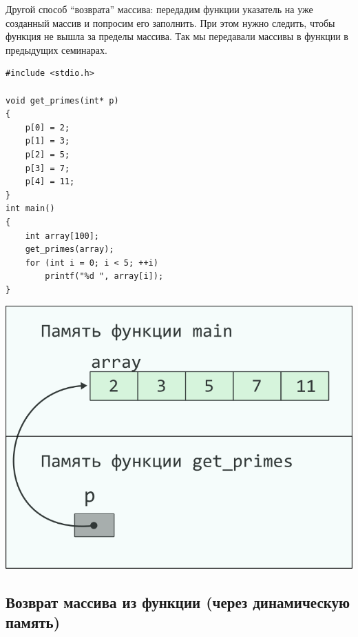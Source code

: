 \documentclass{article}
\begin{document}
Другой способ ``возврата'' массива: передадим функции указатель на
уже созданный массив и попросим его заполнить.
При этом нужно следить, чтобы функция не вышла за пределы массива.
Так мы передавали массивы в функции в предыдущих семинарах.
\begin{multicols}{2}
\begin{lstlisting}
#include <stdio.h>

void get_primes(int* p)
{
	p[0] = 2;
	p[1] = 3;
	p[2] = 5;
	p[3] = 7;
	p[4] = 11;	
}
int main()
{
	int array[100];
	get_primes(array);
	for (int i = 0; i < 5; ++i)
		printf("%d ", array[i]);
}
\end{lstlisting}
\columnbreak
\begin{center}
\includegraphics[scale=1]{../images/pointer_schemes/function_return_arg_array.png}
\end{center}
\end{multicols}
\newpage
\subsection*{Возврат массива из функции (через динамическую память)}
\end{document}

